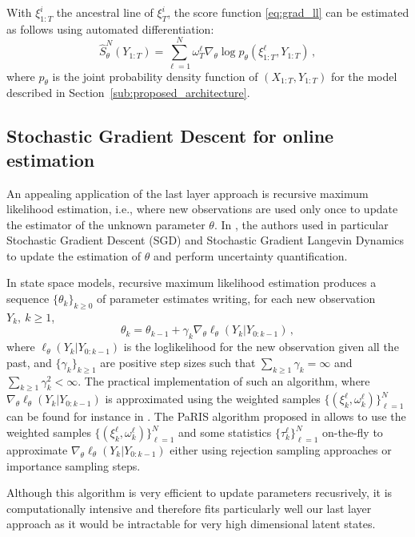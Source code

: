 \documentclass[journal]{IEEEtran}
\begin{document}
With $\xi^i_{1:T}$ the ancestral line of $\xi^i_{T}$, the score function \eqref{eq:grad_ll} can be estimated as follows using automated differentiation:
$$
	\widehat {S}^N_\theta(Y_{1:T}) = \sum_{\ell=1}^N \omega_T^\ell\nabla_\theta\log p_\theta(\xi^\ell_{1:T}, Y_{1:T})\,,
$$
where $p_\theta$ is the joint probability density function of $(X_{1:T}, Y_{1:T})$ for the model described in Section~\ref{sub:proposed_architecture}.


\subsection{Stochastic Gradient Descent for online estimation}
An appealing application of the last layer approach is recursive maximum likelihood estimation, i.e., where new observations are used only once to update the estimator of the unknown parameter $\theta$. In \cite{Brosse2020OnLA}, the authors used in particular Stochastic Gradient Descent (SGD) and Stochastic Gradient Langevin Dynamics to update the estimation of $\theta$ and perform uncertainty quantification.

In state space models, recursive maximum likelihood estimation produces a sequence $\lbrace\theta_k\rbrace_{k\geq 0}$ of parameter estimates writing, for each new observation $Y_{k},~k\geq 1$,
$$
	\theta_{k} = \theta_{k-1} + \gamma_k \nabla_\theta \ell_{\theta}(Y_k | Y_{0:k - 1}) \,,
$$
where $\ell_{\theta}(Y_k | Y_{0:k - 1})$ is the loglikelihood for the new observation given all the past, and $\lbrace\gamma_k\rbrace_{k\geq 1}$ are positive step sizes such that $\sum_{k \geq 1}\gamma_k = \infty$ and $\sum_{k \geq 1}\gamma_k^2 < \infty$. The practical implementation of such an algorithm, where $\nabla_\theta\ell_{\theta}(Y_k | Y_{0:k - 1})$ is approximated using the weighted samples $\{(\xi^{\ell}_k,\omega^{\ell}_k)\}_{\ell=1}^N$ can be found for instance in \cite{gloaguen2022pseudo}. The PaRIS algorithm proposed in \cite{Olsson2014EfficientPO} allows to use the weighted samples $\{(\xi^{\ell}_k,\omega^{\ell}_k)\}_{\ell=1}^N$ and some statistics $\{\tau^{\ell}_k\}_{\ell=1}^N$ on-the-fly to approximate $\nabla_\theta \ell_{\theta}(Y_k | Y_{0:k - 1})$ either using rejection sampling approaches or importance sampling steps.

Although this algorithm is very efficient to update parameters recusrively, it is computationally intensive and therefore fits particularly well our last layer approach as it would be intractable for very high dimensional latent states.
\end{document}
